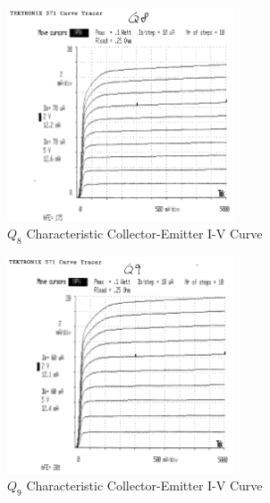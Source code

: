 \documentclass[titlepage, letterpaper, 10.5pt]{article}
\begin{document}
\begin{figure}[ht]
	\centering
	\includegraphics[width=0.6\textwidth]{results/q8-characteristics}
	\caption{$Q_{8}$ Characteristic Collector-Emitter I-V Curve}
\end{figure}

\begin{figure}[ht]
	\centering
	\includegraphics[width=0.6\textwidth]{results/q9-characteristics}
	\caption{$Q_{9}$ Characteristic Collector-Emitter I-V Curve}
\end{figure}
\end{document}
